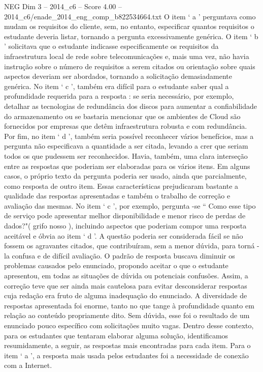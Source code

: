\begin{textsample}{NEG Dim 3 – 2014\_c6 – Score 4.00 – 2014\_c6/enade\_2014\_eng\_comp\_b822534664.txt}
O item ‘ a ’ perguntava como mudam os requisitos do cliente, sem, no entanto, especificar quantos requisitos o estudante deveria listar, tornando a pergunta excessivamente genérica.
O item ‘ b ’ solicitava que o estudante indicasse especificamente os requisitos da infraestrutura local de rede sobre telecomunicações e, mais uma vez, não havia instrução sobre o número de requisitos a serem citados ou orientação sobre quais aspectos deveriam ser abordados, tornando a solicitação demasiadamente genérica.
No item ‘ c ’, também era difícil para o estudante saber qual a profundidade requerida para a resposta : se seria necessário, por exemplo, detalhar as tecnologias de redundância dos discos para aumentar a confiabilidade do armazenamento ou se bastaria mencionar que os ambientes de Cloud são fornecidos por empresas que detêm infraestrutura robusta e com redundância.
Por fim, no item ‘ d ’, também seria possível reconhecer vários benefícios, mas a pergunta não especificava a quantidade a ser citada, levando a crer que seriam todos os que pudessem ser reconhecidos.
Havia, também, uma clara interseção entre as respostas que poderiam ser elaboradas para os vários itens.
Em alguns casos, o próprio texto da pergunta poderia ser usado, ainda que parcialmente, como resposta de outro item.
Essas características prejudicaram bastante a qualidade das respostas apresentadas e também o trabalho de correção e avaliação das mesmas.
No item ‘ c ’, por exemplo, pergunta -se “ Como esse tipo de serviço pode apresentar melhor disponibilidade e menor risco de perdas de dados?"( grifo nosso ), incluindo aspectos que poderiam compor uma resposta aceitável e óbvia ao item ‘ d ’.
A questão poderia ser considerada fácil se não fossem os agravantes citados, que contribuíram, sem a menor dúvida, para torná -la confusa e de difícil avaliação.
O padrão de resposta buscava diminuir os problemas causados pelo enunciado, propondo aceitar o que o estudante apresentou, em todas as situações de dúvida ou potenciais confusões.
Assim, a correção teve que ser ainda mais cautelosa para evitar desconsiderar respostas cuja redação era fruto de alguma inadequação do enunciado.
A diversidade de respostas apresentada foi enorme, tanto no que tange à profundidade quanto em relação ao conteúdo propriamente dito.
Sem dúvida, esse foi o resultado de um enunciado pouco específico com solicitações muito vagas.
Dentro desse contexto, para os estudantes que tentaram elaborar alguma solução, identificamos resumidamente, a seguir, as respostas mais encontradas para cada item.
Para o item ‘ a ’, a resposta mais usada pelos estudantes foi a necessidade de conexão com a Internet.

\end{textsample}

